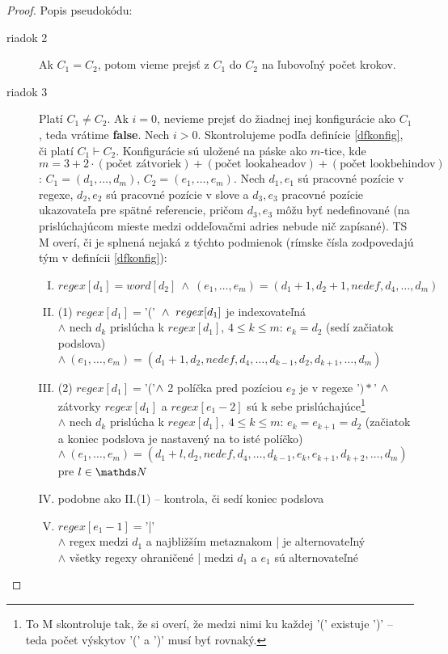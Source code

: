 \begin{proof}
Popis pseudokódu:
\begin{description}
\item[riadok 2] Ak $C_1=C_2$, potom vieme prejsť z $C_1$ do $C_2$ na ľubovoľný počet krokov.
\item[riadok 3] Platí $C_1 \neq C_2$. Ak $i=0$, nevieme prejsť do žiadnej inej konfigurácie ako $C_1$, teda vrátime \textbf{false}. Nech $i>0$. Skontrolujeme podľa definície \ref{dfkonfig}, či platí $C_1 \vdash C_2$. Konfigurácie sú uložené na páske ako $m$-tice, kde $m = 3+2\cdot (\text{počet zátvoriek})+(\text{počet lookaheadov})+(\text{počet lookbehindov})$: $C_1 = (d_1,\dots, d_m)$, $C_2=(e_1,\dots,e_m)$. Nech $d_1, e_1$ sú pracovné pozície v regexe, $d_2,e_2$ sú pracovné pozície v slove a $d_3,e_3$ pracovné pozície ukazovateľa pre spätné referencie, pričom $d_3,e_3$ môžu byť nedefinované (na prislúchajúcom mieste medzi oddeľovačmi adries nebude nič zapísané). TS M overí, či je splnená nejaká z týchto podmienok (rímske čísla zodpovedajú tým v definícii \ref{dfkonfig}):
\begin{enumerate}[I.]
\item $regex[d_1]=word[d_2]~\wedge~(e_1,\dots,e_m) = (d_1+1,d_2+1,nedef,d_4, \dots, d_m)$
\item (1) $regex[d_1]=$'('$ \\ ~\wedge~regex[d_1]$ je indexovateľná 
\\ $\wedge$ nech $d_k$ prislúcha k $regex[d_1]$, $4\leq k \leq m$: $e_k=d_2$ (sedí začiatok podslova) 
\\ $ \wedge ~(e_1,\dots, e_m) = (d_1+1,d_2,nedef,d_4,\dots,d_{k-1},d_2,d_{k+1},\dots,d_m)$
\setcounter{enumi}{1}
\item (2) $regex[d_1]=$'('$ \\ \wedge$ 2 políčka pred pozíciou $e_2$ je v regexe '$)*$' $ 
\\ \wedge$ zátvorky $regex[d_1]$ a $regex[e_1-2]$ sú k sebe prislúchajúce\footnote{To M skontroluje tak, že si overí, že medzi nimi ku každej '(' existuje ')' -- teda počet výskytov '(' a ')' musí byť rovnaký.} 
\\ $\wedge$ nech $d_k$ prislúcha k $regex[d_1],~4\leq k\leq m$: $e_k=e_{k+1}=d_2$ (začiatok a koniec podslova je nastavený na to isté políčko)
\\ $\wedge ~(e_1,\dots,e_m)=(d_1+l, d_2,nedef,d_4,\dots,d_{k-1},e_k,e_{k+1},d_{k+2},\dots,d_m)$ pre $l\in\nobreak\N$
\item podobne ako II.(1) -- kontrola, či sedí koniec podslova
\item $regex[e_1-1] =$'|' \\ $\wedge$ regex medzi $d_1$ a najbližším metaznakom | je alternovateľný \\ $\wedge$ všetky regexy ohraničené | medzi $d_1$ a $e_1$ sú alternovateľné 

\end{enumerate}
\end{description}
\end{proof}
